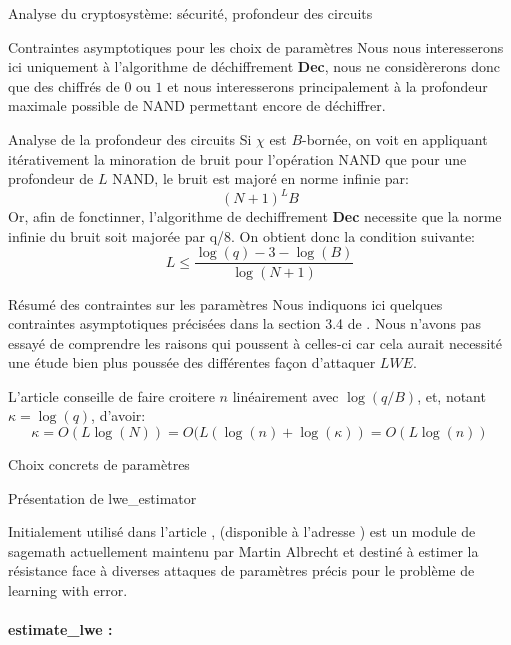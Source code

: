 \begin{section}{Analyse du cryptosystème: sécurité, profondeur des circuits}
\begin{subsection}{Contraintes asymptotiques pour les choix de paramètres}
	Nous nous interesserons ici uniquement à l'algorithme de déchiffrement
	\textbf{Dec}, nous ne considèrerons donc que des chiffrés de $0$ ou
	$1$ et nous interesserons principalement à la profondeur maximale 
	possible de NAND permettant encore de déchiffrer.

	\begin{subsubsection}{Analyse de la profondeur des circuits}
	Si $\chi$ est $B$-bornée, on voit en appliquant itérativement la
	minoration de bruit pour l'opération NAND que pour une profondeur de 
	$L$ NAND, le bruit est majoré en norme infinie par:
	\[{(N + 1)}^L B\]
	Or, afin de fonctinner, l'algorithme de dechiffrement
	\textbf{Dec} necessite que la norme infinie du bruit soit majorée par q/8.
	On obtient donc la condition suivante:
	\begin{equation}
		\label{depth}
		L \leq\frac{ \log(q) - 3 - \log(B)}{\log(N+1)}	\end{equation}
	\end{subsubsection}
	\begin{subsubsection}{Résumé des contraintes sur les paramètres}
	Nous indiquons ici quelques contraintes asymptotiques précisées
	dans la section 3.4 de \cite{EPRINT:GenSahWat13}. Nous n'avons 
	pas essayé de comprendre les raisons qui poussent à celles-ci
	car cela aurait necessité une étude bien plus poussée des différentes
	façon d'attaquer $LWE$.

	L'article conseille de faire croitere $n$ linéairement avec $\log(q/B)$, et,
	notant $\kappa = \log(q)$, d'avoir:
	\[ \kappa = O(L \log(N)) = O(L(\log(n) + \log(\kappa)) = O(L\log(n))\]

	\end{subsubsection}
	\end{subsection} %

	\begin{subsection}{Choix concrets de paramètres}
	\begin{subsubsection}{Présentation de lwe\_estimator}
	
		Initialement utilisé dans l'article
		\cite{EPRINT:AlbPlaSco15},
		(disponible à l'adresse \cite{estimator}) est un module de sagemath actuellement maintenu par
	Martin Albrecht et 
	destiné à estimer la résistance face à diverses attaques de paramètres précis pour
	le problème de learning with error.
	
	
	\paragraph{}
	\textbf{estimate\_lwe :}


\end{subsubsection}
\end{subsection}
\end{section}
